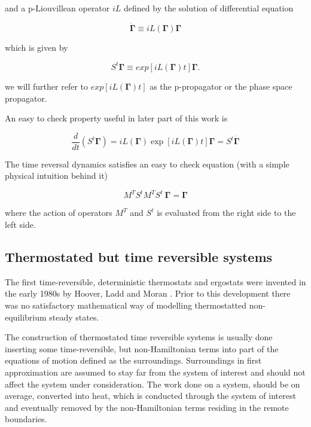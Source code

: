 \documentclass[a4paper,12pt,nofootinbib]{article}
\begin{document}
and a p-Liouvillean operator $iL$ defined by the solution of differential equation 

\begin{equation}
 \dot{\bm{\Gamma}} \equiv iL(\bm{\Gamma})\bm{\Gamma}
\end{equation}

which is given by

\begin{equation}
  S^t \bm{\Gamma} \equiv exp[iL(\bm{\Gamma})t]\bm{\Gamma}.
\end{equation}


we will further refer to $ exp[iL(\bm{\Gamma})t] $ as the p-propagator or the phase space propagator.


An easy to check property useful in later part of this work is

\begin{equation}
\label{PhaseTimeDer}
  \frac{d}{dt}(S^t \bm{\Gamma})=iL(\bm{\Gamma})\exp[iL(\bm{\Gamma})t]\bm{\Gamma}=S^t \dot{\bm{\Gamma}}
\end{equation}




The time reversal dynamics satisfies an easy to check equation (with a simple physical intuition behind it)

\begin{equation}
  M^T S^t M^T S^t\ \bm{\Gamma} = \bm{\Gamma}
\end{equation}

where the action of operators $M^T$ and $S^t$ is evaluated from the right side to the left side.

\subsection{Thermostated but time reversible systems}

The first time-reversible, deterministic thermostats and ergostats were invented in the early 1980s by Hoover, Ladd and Moran . Prior to this development there was no satisfactory mathematical way of modelling thermostatted non-equilibrium steady states. \cite{Hoover:1982dp}

The construction of thermostated time reversible systems is usually done inserting some time-reversible, but non-Hamiltonian terms into part of the equations of motion defined as the surroundings. Surroundings in first approximation are assumed to stay far from the system of interest and should not affect the system under consideration.
The work done on a system, should be on average, converted into heat, which is conducted through the system of interest and eventually removed by the non-Hamiltonian terms residing in the remote boundaries.
\end{document}
